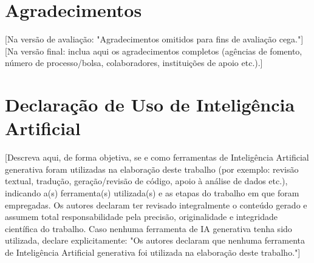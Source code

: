 \documentclass[sigconf, nonacm, screen, language=portuguese, language=spanish, language={main=english}]{acmart}             %
\begin{document}
\section*{Agradecimentos}
[Na versão de avaliação: "Agradecimentos omitidos para fins de avaliação cega."]
[Na versão final: inclua aqui os agradecimentos completos (agências de fomento, número de processo/bolsa, colaboradores, instituições de apoio etc.).]


\section*{Declaração de Uso de Inteligência Artificial}
[Descreva aqui, de forma objetiva, se e como ferramentas de Inteligência
Artificial generativa foram utilizadas na elaboração deste trabalho
(por exemplo: revisão textual, tradução, geração/revisão de código,
apoio à análise de dados etc.), indicando a(s) ferramenta(s)
utilizada(s) e as etapas do trabalho em que foram empregadas. Os
autores declaram ter revisado integralmente o conteúdo gerado e
assumem total responsabilidade pela precisão, originalidade e
integridade científica do trabalho. Caso nenhuma ferramenta de IA
generativa tenha sido utilizada, declare explicitamente: "Os autores
declaram que nenhuma ferramenta de Inteligência Artificial generativa
foi utilizada na elaboração deste trabalho."]
\end{document}
